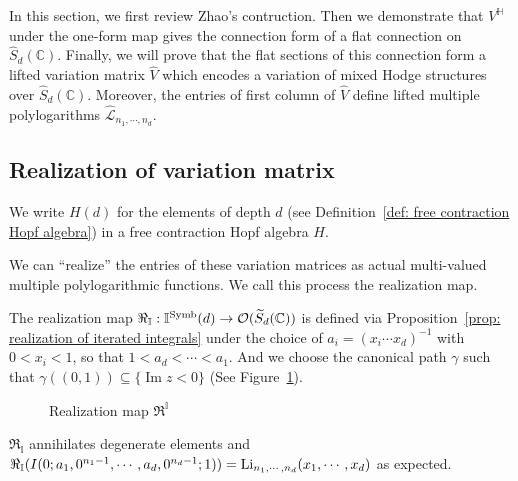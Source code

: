 In this section, we first review Zhao's contruction. Then we demonstrate that $V^{\mathbb H}$ under the one-form map gives the connection form of a flat connection on $\widehat S_d(\mathbb C)$. Finally, we will prove that the flat sections of this connection form a lifted variation matrix $\widehat V$ which encodes a variation of mixed Hodge structures over $\widehat S_d(\mathbb C)$. Moreover, the entries of first column of $\widehat V$ define lifted multiple polylogarithms $\widehat{\mathcal L}_{n_1,\cdots,n_d}$.

\subsection{Realization of variation matrix}

We write $H(d)$ for the elements of depth $d$ (see Definition~\ref{def: free contraction Hopf algebra}) in a free contraction Hopf algebra $H$.

We can ``realize'' the entries of these variation matrices as actual multi-valued multiple polylogarithmic functions. We call this process the realization map.

\begin{definition}\label{def: Re_I}
The realization map $\Re_{\mathbb I}:\mathbb I^{\operatorname{Symb}}(d)\to\mathcal O(\widetilde S_d(\mathbb C))$ is defined via Proposition~\ref{prop: realization of iterated integrals} under the choice of $a_i=(x_i\cdots x_d)^{-1}$ with $0<x_i<1$, so that $1<a_d<\cdots<a_1$. And we choose the canonical path $\gamma$ such that $\gamma((0,1))\subseteq\{\operatorname{Im}z<0\}$ (See Figure~\ref{fig: Realization map R^I}).
\end{definition}

\begin{figure}
\centering
{}
\caption{Realization map $\Re^{\mathbb I}$}
\label{fig: Realization map R^I}
\end{figure}

$\Re_{\mathbb I}$ annihilates degenerate elements and $\Re_{\mathbb I}(I(0;a_1,0^{n_1-1},\cdots,a_d,0^{n_d-1};1))=\operatorname{Li}_{n_1,\cdots,n_d}(x_1,\cdots,x_d)$ as expected.

